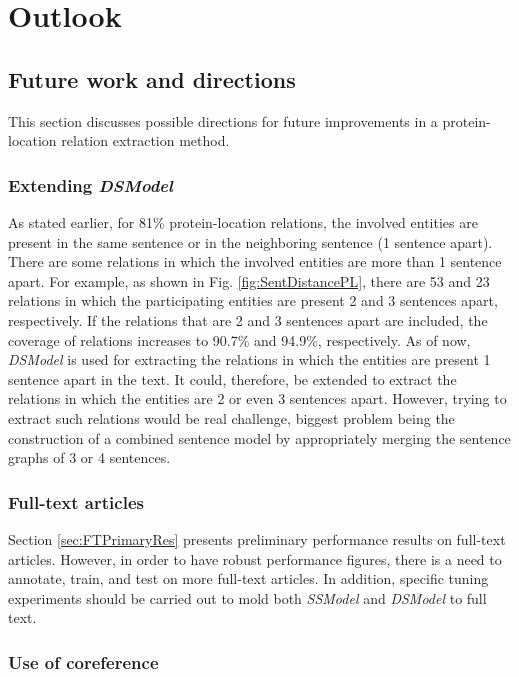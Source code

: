 \chapter{Outlook}\label{chapter:outlook}

\section{Future work and directions}

This section discusses possible directions for future improvements in a protein-location relation extraction method.

\subsection{Extending \textit{DSModel}}

As stated earlier, for 81\% protein-location relations, the involved entities are present in the same sentence or in the neighboring sentence (1 sentence apart). There are some relations in which the involved entities are more than 1 sentence apart. For example, as shown in Fig. \ref{fig:SentDistancePL}, there are 53 and 23 relations in which the participating entities are present 2 and 3 sentences apart, respectively. If the relations that are 2 and 3 sentences apart are included, the coverage of relations increases to 90.7\% and 94.9\%, respectively. As of now, \textit{DSModel} is used for extracting the relations in which the entities are present 1 sentence apart in the text. It could, therefore, be extended to extract the relations in which the entities are 2 or even 3 sentences apart. However, trying to extract such relations would be real challenge, biggest problem being the construction of a combined sentence model by appropriately merging the sentence graphs of 3 or 4 sentences.

\subsection{Full-text articles}

Section \ref{sec:FTPrimaryRes} presents preliminary performance results on full-text articles. However, in order to have robust performance figures, there is a need to annotate, train, and test on more full-text articles. In addition, specific tuning experiments should be carried out to mold both \textit{SSModel} and \textit{DSModel} to full text.

\subsection{Use of coreference}

